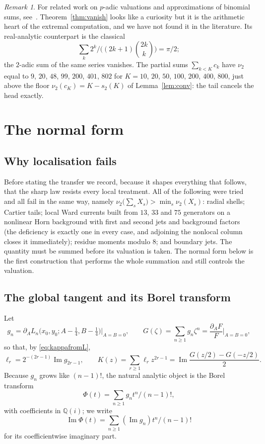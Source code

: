 \documentclass[12pt]{amsart}
\theoremstyle{definition}
\theoremstyle{remark}
\newtheorem{remark}[theorem]{Remark}
\begin{document}
\begin{remark}
For related work on $p$-adic valuations and approximations of binomial sums, see~\cite{AidagulovAlekseyev,ZhangYuan}.  Theorem~\ref{thm:vanish} looks like a curiosity but it is the arithmetic heart of the extremal computation, and we have not found it in the literature.  Its real-analytic counterpart is the classical
\[
\sum_k2^k/\bigl((2k+1)\binom{2k}k\bigr)=\pi/2;
\]
the $2$-adic sum of the same series vanishes.  The partial sums $\sum_{k<K}c_k$ have $\nu_2$ equal to $9$, $20$, $48$, $99$, $200$, $401$, $802$ for $K=10$, $20$, $50$, $100$, $200$, $400$, $800$, just above the floor $\nu_2(c_K)=K-s_2(K)$ of Lemma~\ref{lem:conv}: the tail cancels the head exactly.
\end{remark}

\section{The normal form}\label{sec:normalform}

\subsection{Why localisation fails}

Before stating the transfer we record, because it shapes everything that follows, that the sharp law resists every local treatment.  All of the
following were tried and all fail in the same way, namely $\nu_2\bigl(\sum_sX_s\bigr)>\min_s\nu_2(X_s)$: radial shells; Cartier tails; local Ward currents built from $13$, $33$ and $75$ generators on a nonlinear Horn background with first and second jets and background factors (the
deficiency is exactly one in every case, and adjoining the nonlocal column closes it immediately); residue moments modulo $8$; and boundary jets.  The quantity must be summed before its valuation is taken.  The normal form below is the first construction that performs the whole summation and still controls the valuation.

\subsection{The global tangent and its Borel transform}

Let
\[
  g_n=\partial_AL_n\bigl(x_0,y_0;A-\tfrac14,B-\tfrac14\bigr)\Big|_{A=B=0},
  \qquad
  G(\zeta)=\sum_{n\ge1}g_n\zeta^n=\frac{\partial_AF}F\bigg|_{A=B=0},
\]
so that, by \eqref{eq:kappafromL},
\begin{equation}\label{eq:ltangent}
  \ell_r=2^{-(2r-1)}\operatorname{Im}g_{2r-1},\qquad   K(z)=\sum_{r\ge1}\ell_rz^{2r-1}      =\operatorname{Im}\frac{G(z/2)-G(-z/2)}2 .
\end{equation}
Because $g_n$ grows like $(n-1)!$, the natural analytic object is the Borel transform 
\[
\Phi(t)=\sum_{n\ge1}g_nt^n/(n-1)!, 
\]
with coefficients in $\mathbb Q(i)$; we write 
\[
\operatorname{Im}\Phi(t)=\sum_{n\ge1}(\operatorname{Im}g_n)t^n/(n-1)!
\]
for its coefficientwise imaginary part.
\end{document}
